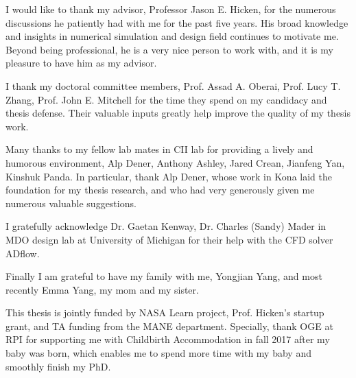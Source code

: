  
 

I would like to thank my advisor, Professor Jason E. Hicken, for the numerous discussions he patiently had with me 
for the past five years. His broad knowledge and insights in numerical simulation and design field continues to motivate me.  Beyond being professional, he is a very nice person to work with, and it is my pleasure to have him as my advisor. 

I thank my doctoral committee members, Prof. Assad A. Oberai, Prof. Lucy T. Zhang, Prof. John E. Mitchell for the time they spend on my candidacy and thesis defense. Their valuable inputs greatly help improve the quality of my thesis work. 

Many thanks to my fellow lab mates in CII lab for providing a lively and humorous environment, Alp Dener, Anthony Ashley,  Jared Crean, Jianfeng Yan, Kinshuk Panda. In particular, thank Alp Dener, whose work in Kona laid the foundation for my thesis research, and who had very generously given me numerous valuable suggestions. 

I gratefully acknowledge Dr. Gaetan Kenway, Dr. Charles (Sandy) Mader in MDO design lab at University of Michigan for their help with the CFD solver ADflow. 

Finally I am grateful to have my family with me, Yongjian Yang, and most recently Emma Yang, my mom and my sister. 

%

This thesis is jointly funded by NASA Learn project, Prof. Hicken's startup grant, and TA funding from the MANE department. Specially, thank OGE at RPI for supporting me with Childbirth Accommodation in fall 2017 after my baby was born, which enables me to spend more time with my baby and smoothly finish my PhD. 
